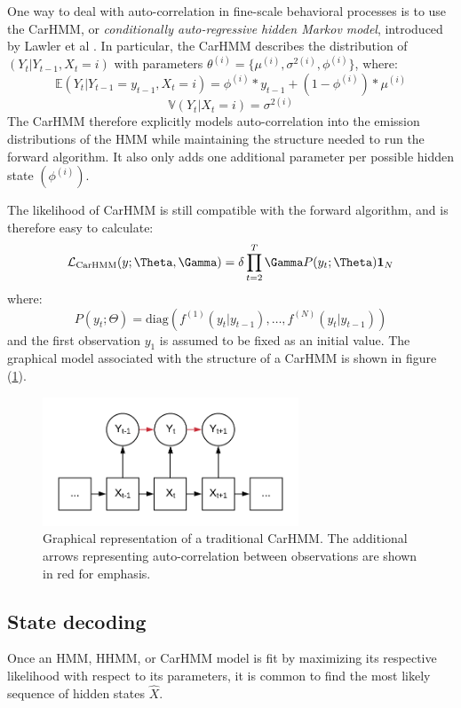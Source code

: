 One way to deal with auto-correlation in fine-scale behavioral processes is to use the CarHMM, or \textit{conditionally auto-regressive hidden Markov model}, introduced by Lawler et al \cite{Lawler:2019}. In particular, the CarHMM describes the distribution of $(Y_t|Y_{t-1}, X_t=i)$ with parameters $\theta^{(i)} = \{\mu^{(i)},\sigma^{2(i)},\phi^{(i)}\}$, where:
%
$$\mathbb{E}(Y_t|Y_{t-1} = y_{t-1},X_t=i) = \phi^{(i)}*y_{t-1} + (1-\phi^{(i)}) * \mu^{(i)}$$
$$\mathbb{V}(Y_t| X_t = i) = \sigma^{2(i)}$$
%
The CarHMM therefore explicitly models auto-correlation into the emission distributions of the HMM while maintaining the structure needed to run the forward algorithm. It also only adds one additional parameter per possible hidden state $(\phi^{(i)})$. 

The likelihood of CarHMM is still compatible with the forward algorithm, and is therefore easy to calculate:
\begin{equation}
\calL_{\text{CarHMM}}(y;\Theta,\Gamma) = \delta \prod_{t=2}^T \Gamma P(y_t;\Theta) \mathbf{1}_N
\label{CarHMM_likelihood}
\end{equation}
where:
%
$$P(y_t;\Theta) = \text{diag}\left(f^{(1)}(y_t|y_{t-1}), \ldots , f^{(N)}(y_t|y_{t-1}) \right)$$
%
and the first observation $y_1$ is assumed to be fixed as an initial value. The graphical model associated with the structure of a CarHMM is shown in figure (\ref{fig:CarHMM}).

\begin{figure}[h!]
	\centering
	\includegraphics[width=3in]{../Plots/CarHMM.png}
	\caption{Graphical representation of a traditional CarHMM. The additional arrows representing auto-correlation between observations are shown in red for emphasis.}
	\label{fig:CarHMM}
\end{figure}


\subsection{State decoding}

Once an HMM, HHMM, or CarHMM model is fit by maximizing its respective likelihood with respect to its parameters, it is common to find the most likely sequence of hidden states $\hat X$. 

